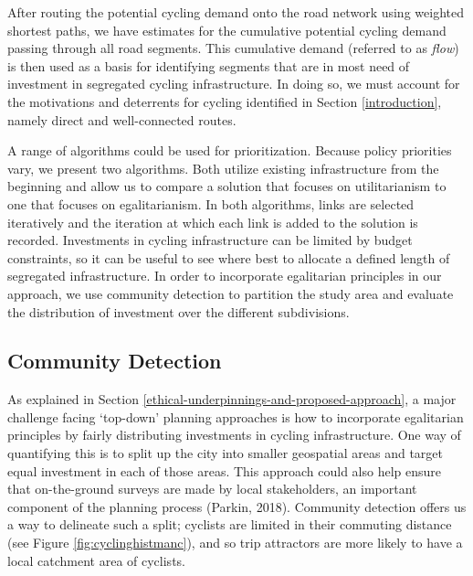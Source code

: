 \documentclass[
]{article}
\begin{document}
After routing the potential cycling demand onto the road network using
weighted shortest paths, we have estimates for the cumulative potential
cycling demand passing through all road segments. This cumulative demand
(referred to as \emph{flow}) is then used as a basis for identifying segments
that are in most need of investment in segregated cycling
infrastructure. In doing so, we must account for the motivations and
deterrents for cycling identified in Section \ref{introduction}, namely
direct and well-connected routes.

A range of algorithms could be used for prioritization. Because policy
priorities vary, we present two algorithms. Both utilize existing
infrastructure from the beginning and allow us to compare a solution
that focuses on utilitarianism to one that focuses on egalitarianism. In
both algorithms, links are selected iteratively and the iteration at
which each link is added to the solution is recorded. Investments in
cycling infrastructure can be limited by budget constraints, so it can
be useful to see where best to allocate a defined length of segregated
infrastructure. In order to incorporate egalitarian principles in our
approach, we use community detection to partition the study area and
evaluate the distribution of investment over the different subdivisions.

\hypertarget{community-detection}{%
\subsection{Community Detection}\label{community-detection}}

As explained in Section
\ref{ethical-underpinnings-and-proposed-approach}, a major challenge
facing `top-down' planning approaches is how to incorporate egalitarian
principles by fairly distributing investments in cycling infrastructure.
One way of quantifying this is to split up the city into smaller
geospatial areas and target equal investment in each of those areas.
This approach could also help ensure that on-the-ground surveys are made
by local stakeholders, an important component of the planning process
(Parkin, 2018). Community detection offers us a way to
delineate such a split; cyclists are limited in their commuting distance
(see Figure \ref{fig:cyclinghistmanc}), and so trip attractors are more
likely to have a local catchment area of cyclists.
\end{document}
